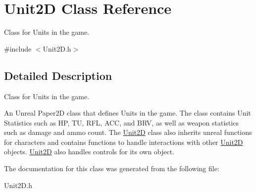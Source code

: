 \hypertarget{class_unit2_d}{}\section{Unit2D Class Reference}
\label{class_unit2_d}


Class for Units in the game.  




{\ttfamily \#include $<$Unit2\+D.\+h$>$}



\subsection{Detailed Description}
Class for Units in the game. 

An Unreal Paper2D class that defines Units in the game. The class contains Unit Statistics such as HP, TU, R\+FL, A\+CC, and B\+RV, as well as weapon statistics such as damage and ammo count. The \hyperlink{class_unit2_d}{Unit2D} class also inherits unreal functions for characters and contains functions to handle interactions with other \hyperlink{class_unit2_d}{Unit2D} objects. \hyperlink{class_unit2_d}{Unit2D} also handles controls for its own object. 

The documentation for this class was generated from the following file\+:\begin{DoxyCompactItemize}
\item 
Unit2\+D.\+h\end{DoxyCompactItemize}
